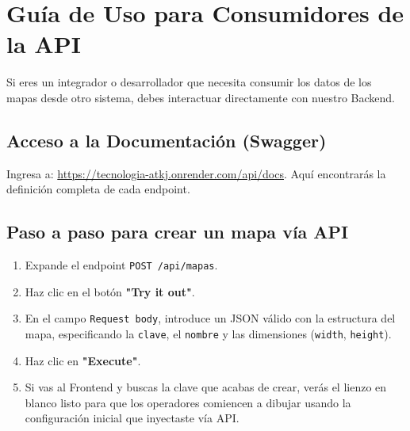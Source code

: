 \documentclass[12pt,a4paper]{article}
\begin{document}
\section{Guía de Uso para Consumidores de la API}
Si eres un integrador o desarrollador que necesita consumir los datos de los mapas desde otro sistema, debes interactuar directamente con nuestro Backend.

\subsection{Acceso a la Documentación (Swagger)}
Ingresa a: \href{https://tecnologia-atkj.onrender.com/api/docs}{https://tecnologia-atkj.onrender.com/api/docs}.
Aquí encontrarás la definición completa de cada endpoint.

\subsection{Paso a paso para crear un mapa vía API}
\begin{enumerate}
    \item Expande el endpoint \texttt{POST /api/mapas}.
    \item Haz clic en el botón \textbf{"Try it out"}.
    \item En el campo \texttt{Request body}, introduce un JSON válido con la estructura del mapa, especificando la \texttt{clave}, el \texttt{nombre} y las dimensiones (\texttt{width}, \texttt{height}).
    \item Haz clic en \textbf{"Execute"}. 
    \item Si vas al Frontend y buscas la clave que acabas de crear, verás el lienzo en blanco listo para que los operadores comiencen a dibujar usando la configuración inicial que inyectaste vía API.
\end{enumerate}
\end{document}
